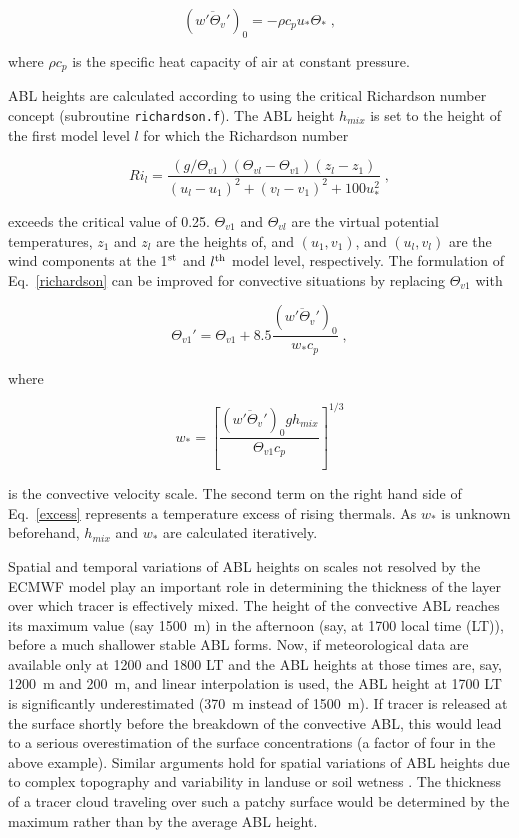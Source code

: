\documentclass{egu}            %
\begin{document}
\begin{equation}
(\overline{w'\Theta_v'})_0=-\rho c_p u_* \Theta_* \;,
\end{equation}

where $\rho c_p$ is the specific heat capacity of air at constant pressure.

ABL heights are calculated according to \citet{vogelezang1996} using the
critical Richardson number concept (subroutine \verb|richardson.f|).  The ABL
height $h_{mix}$ is set to the height of the first model level $l$ for which
the Richardson number

\begin{equation}
Ri_l=\frac{(g/\Theta_{v1})(\Theta_{vl}-\Theta_{v1})(z_l-z_1)}{(u_l-u_1)^2+(v_l-v_1)^2+100u_*^2}\;,
\label{richardson}
\end{equation}

exceeds the critical value of 0.25.  $\Theta_{v1}$ and $\Theta_{vl}$ are the
virtual potential temperatures, $z_1$ and $z_l$ are the heights of, and
$(u_1,v_1)$, and $(u_l,v_l)$ are the wind components at the 1$^{\rm st}$ and
$l^{\rm th}$ model level, respectively.  The formulation of
Eq.~\ref{richardson} can be improved for convective situations by replacing
$\Theta_{v1}$ with

\begin{equation}
\Theta_{v1}'=\Theta_{v1}+8.5\frac{(\overline{w'\Theta_v'})_0}{w_* c_p}\;,
\label{excess}
\end{equation}

where

\begin{equation}
w_*=\left[{ \frac{(\overline{w'\Theta_v'})_0 g h_{mix}}{\Theta_{v1} c_p} }\right]^{1/3}
\end{equation}

is the convective velocity scale.  The second term on the right hand side of
Eq.~\ref{excess} represents a temperature excess of rising thermals.  As $w_*$
is unknown beforehand, $h_{mix}$ and $w_*$ are calculated iteratively.

Spatial and temporal variations of ABL heights on scales not resolved by the
ECMWF model play an important role in determining the thickness of the layer
over which tracer is effectively mixed.  The height of the convective ABL
reaches its maximum value (say 1500~m) in the afternoon (say, at 1700 local
time (LT)), before a much shallower stable ABL forms.  Now, if meteorological
data are available only at 1200 and 1800 LT and the ABL heights at those times
are, say, 1200~m and 200~m, and linear interpolation is used, the ABL height at
1700 LT is significantly underestimated (370~m instead of 1500~m).  If tracer
is released at the surface shortly before the breakdown of the convective ABL,
this would lead to a serious overestimation of the surface concentrations (a
factor of four in the above example).  Similar arguments hold for spatial
variations of ABL heights due to complex topography and variability in landuse
or soil wetness \citep{hubbe1997}.  The thickness of a tracer cloud traveling
over such a patchy surface would be determined by the maximum rather than by
the average ABL height.
\end{document}
